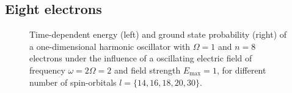 \vfill
\pagebreak

\subsection*{Eight electrons}

\begin{figure}[!h]
    \centering
    \caption{Time-dependent energy (left) and ground state probability (right)
        of a one-dimensional harmonic oscillator with $\Omega=1$
        and $n=8$ electrons under the influence of a oscillating electric field 
        of frequency $\omega = 2 \Omega = 2$ and field strength $E_\text{max}=1$,
        for different number of spin-orbitals $l=\{14,16,18,20,30\}$.
    }
    \label{fig:1d_n8_qd}
\end{figure}

